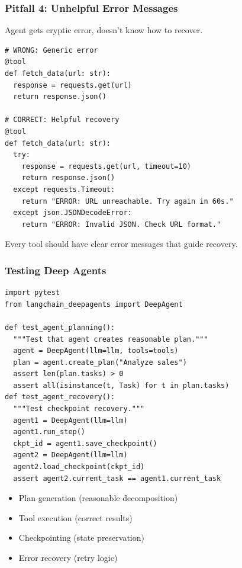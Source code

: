\documentclass[aspectratio=169,11pt]{beamer}
\begin{document}
\begin{frame}[fragile]
\frametitle{Pitfall 4: Unhelpful Error Messages}

\begin{warningbox}
Agent gets cryptic error, doesn't know how to recover.
\end{warningbox}

\begin{lstlisting}
# WRONG: Generic error
@tool
def fetch_data(url: str):
  response = requests.get(url)
  return response.json()

# CORRECT: Helpful recovery
@tool
def fetch_data(url: str):
  try:
    response = requests.get(url, timeout=10)
    return response.json()
  except requests.Timeout:
    return "ERROR: URL unreachable. Try again in 60s."
  except json.JSONDecodeError:
    return "ERROR: Invalid JSON. Check URL format."
\end{lstlisting}

\begin{tipbox}
Every tool should have clear error messages that guide recovery.
\end{tipbox}

\end{frame}

\begin{frame}[fragile]
\frametitle{Testing Deep Agents}

\begin{lstlisting}
import pytest
from langchain_deepagents import DeepAgent

def test_agent_planning():
  """Test that agent creates reasonable plan."""
  agent = DeepAgent(llm=llm, tools=tools)
  plan = agent.create_plan("Analyze sales")
  assert len(plan.tasks) > 0
  assert all(isinstance(t, Task) for t in plan.tasks)
def test_agent_recovery():
  """Test checkpoint recovery."""
  agent1 = DeepAgent(llm=llm)
  agent1.run_step()
  ckpt_id = agent1.save_checkpoint()
  agent2 = DeepAgent(llm=llm)
  agent2.load_checkpoint(ckpt_id)
  assert agent2.current_task == agent1.current_task
\end{lstlisting}

\begin{tipbox}
\begin{itemize}
    \setlength{\itemsep}{1pt}
  \item Plan generation (reasonable decomposition)
  \item Tool execution (correct results)
  \item Checkpointing (state preservation)
  \item Error recovery (retry logic)
\end{itemize}
\end{tipbox}

\end{frame}
\end{document}
